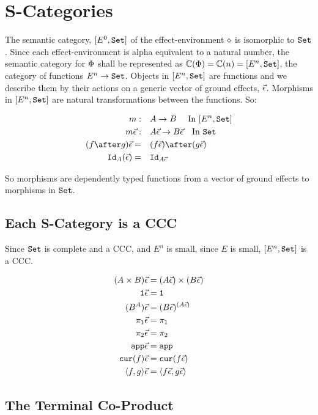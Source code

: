     \section{S-Categories}
    The semantic category, $[E^0, \set]$ of the effect-environment $\nil$ is isomorphic to $\set$. Since each effect-environment is alpha equivalent to a natural number, the semantic category for $\P$ shall be represented as $\C(\P) = \C(n) = [E^n, \set]$, the category of functions $E^n\rightarrow \set$. Objects in $[E^n, \set]$ are functions and we describe them by their actions on a generic vector of ground effects, $\ev$. Morphisms in $[E^n, \set]$ are natural transformations between the functions. So:
    
    \begin{align*}
        m:\quad&A \rightarrow B \qt{ In $[E^n, \set]$}\\
        m\ev:\quad& A\ev \rightarrow B\ev \qt{In $\set$}\\
        (f\after g)\ev =\quad& (f\ev)\after(g\ev)\\
        \Id{A}(\ev) =\quad& \Id{A\ev}
    \end{align*}
    
    So morphisms are dependently typed functions from a vector of ground effects to morphisms in $\set$.
    \subsection{Each S-Category is a CCC}
    Since $\set$ is complete and a CCC, and $E^n$ is small, since $E$ is small, $[E^n, \set]$ is a CCC.
    
    \begin{align*}
        (A\times B)\ev & = (A\ev)\times(B\ev)\\
        \1\ev & = \1\\
        (B^A)\ev &= (B\ev)^{(A\ev)}\\
        \p\ev & = \p\\
        \pp\ev & = \pp\\
        \app\ev & = \app\\
        \cur{f}\ev & = \cur{f\ev}\\
        \pr{f}{g}\ev & = \pr{f\ev}{g\ev}\\
    \end{align*}
    
    \subsection{The Terminal Co-Product}
    
